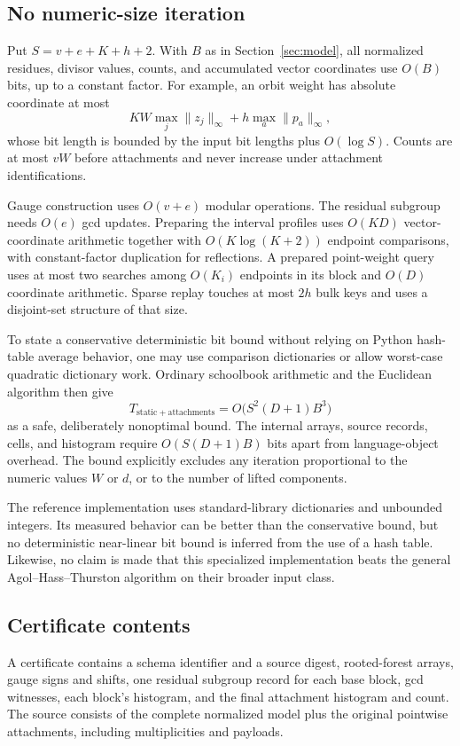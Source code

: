 \documentclass[11pt]{article}
\theoremstyle{definition}
\begin{document}
\subsection{No numeric-size iteration}
Put $S=v+e+K+h+2$. With $B$ as in Section~\ref{sec:model}, all normalized residues, divisor values, counts, and accumulated vector coordinates use $O(B)$ bits, up to a constant factor. For example, an orbit weight has absolute coordinate at most
\[
 KW\max_j\|z_j\|_\infty+h\max_a\|p_a\|_\infty,
\]
whose bit length is bounded by the input bit lengths plus $O(\log S)$. Counts are at most $vW$ before attachments and never increase under attachment identifications.

Gauge construction uses $O(v+e)$ modular operations. The residual subgroup needs $O(e)$ gcd updates. Preparing the interval profiles uses $O(KD)$ vector-coordinate arithmetic together with $O(K\log(K+2))$ endpoint comparisons, with constant-factor duplication for reflections. A prepared point-weight query uses at most two searches among $O(K_i)$ endpoints in its block and $O(D)$ coordinate arithmetic. Sparse replay touches at most $2h$ bulk keys and uses a disjoint-set structure of that size.

To state a conservative deterministic bit bound without relying on Python hash-table average behavior, one may use comparison dictionaries or allow worst-case quadratic dictionary work. Ordinary schoolbook arithmetic and the Euclidean algorithm then give
\begin{equation}
 T_{\mathrm{static+attachments}}=O\bigl(S^2(D+1)B^3\bigr)
 \label{eq:safebits}
\end{equation}
as a safe, deliberately nonoptimal bound. The internal arrays, source records, cells, and histogram require $O(S(D+1)B)$ bits apart from language-object overhead. The bound explicitly excludes any iteration proportional to the numeric values $W$ or $d$, or to the number of lifted components.

The reference implementation uses standard-library dictionaries and unbounded integers. Its measured behavior can be better than the conservative bound, but no deterministic near-linear bit bound is inferred from the use of a hash table. Likewise, no claim is made that this specialized implementation beats the general Agol--Hass--Thurston algorithm on their broader input class.

\subsection{Certificate contents}
A certificate contains a schema identifier and a source digest, rooted-forest arrays, gauge signs and shifts, one residual subgroup record for each base block, gcd witnesses, each block's histogram, and the final attachment histogram and count. The source consists of the complete normalized model plus the original pointwise attachments, including multiplicities and payloads.
\end{document}
